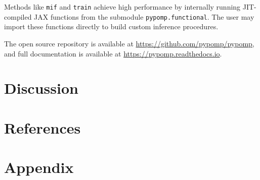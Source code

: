 \documentclass[twoside,11pt]{article}
\begin{document}
Methods like \texttt{mif} and \texttt{train} achieve high performance by
internally running JIT-compiled JAX functions from the submodule
\texttt{pypomp.functional}. The user may import these functions directly
to build custom inference procedures.

The open source repository is available at
\url{https://github.com/pypomp/pypomp}, and full documentation is
available at \url{https://pypomp.readthedocs.io}.

\section{Discussion}\label{sec-discussion}

\section*{References}\label{references}

\renewcommand{\bibsection}{}


\section{Appendix}\label{sec-appendix}

\end{document}
